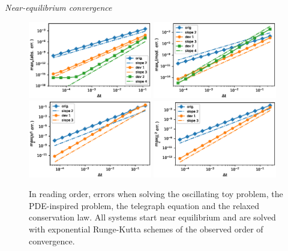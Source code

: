 \medskip
\noindent\textit{Near-equilibrium convergence}\\
%
\begin{figure}
\centering
\includegraphics[width=0.48\textwidth]{./miMa_Dissipatif/ord_gain_oscill.eps}
\includegraphics[width=0.48\textwidth]{./miMa_Dissipatif/ord_gain_hyperb_ode.eps}
\\
\includegraphics[width=0.48\textwidth]{./miMa_Dissipatif/ord_gain_telegraph.eps}
\includegraphics[width=0.48\textwidth]{./miMa_Dissipatif/ord_gain_cons_law.eps}
\vspace*{-10pt}
\caption{In reading order, errors when solving the oscillating toy
problem, the PDE-inspired problem, the telegraph equation and the relaxed
conservation law. All systems start near equilibrium and are solved with
exponential Runge-Kutta schemes of the observed order of convergence.}
\label{test_fig:order_gain}
\end{figure}%
